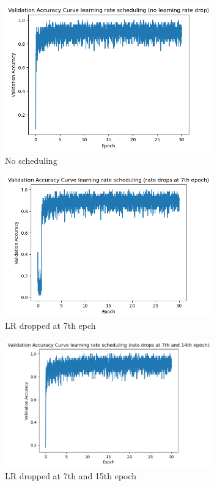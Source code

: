 \documentclass{assignment}
\begin{document}
\begin{figure}[!htb]
    \centering
    \includegraphics[width=0.8\textwidth]{figures/part5_cnn_3_scheduled_1.png}
    \caption{No scheduling}
    \label{fig:q5_sch_1}
\end{figure}

\begin{figure}[!htb]
    \centering
    \includegraphics[width=0.8\textwidth]{figures/part5_cnn_3_scheduled_2.png}
    \caption{LR dropped at 7th epch}
    \label{fig:q5_sch_2}
\end{figure}
\begin{figure}[!htb]
    \centering
    \includegraphics[width=0.8\textwidth]{figures/part5_cnn_3_scheduled_3.png}
    \caption{LR dropped at 7th and 15th epoch}
    \label{fig:q5_sch_3}
\end{figure}
\end{document}
